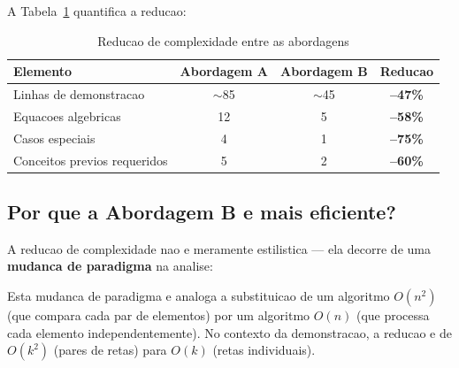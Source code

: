 \documentclass[5p]{elsarticle}
\theoremstyle{definition}
\begin{document}
A Tabela~\ref{tab:reduction} quantifica a reducao:

\begin{table}[H]
  \centering
  \caption{Reducao de complexidade entre as abordagens}
  \label{tab:reduction}
  \begin{tabular}{lccc}
    \toprule
    \textbf{Elemento} & \textbf{Abordagem A} & \textbf{Abordagem B} & \textbf{Reducao} \\
    \midrule
    Linhas de demonstracao & $\sim$85 & $\sim$45 & \textbf{--47\%} \\
    Equacoes algebricas & 12 & 5 & \textbf{--58\%} \\
    Casos especiais & 4 & 1 & \textbf{--75\%} \\
    Conceitos previos requeridos & 5 & 2 & \textbf{--60\%} \\
    \bottomrule
  \end{tabular}
\end{table}

\subsection{Por que a Abordagem B e mais eficiente?}

A reducao de complexidade nao e meramente estilistica — ela decorre de uma \textbf{mudanca
de paradigma} na analise:

\begin{center}
\end{center}

Esta mudanca de paradigma e analoga a substituicao de um algoritmo $O(n^2)$ (que compara
cada par de elementos) por um algoritmo $O(n)$ (que processa cada elemento independentemente).
No contexto da demonstracao, a reducao e de $O(k^2)$ (pares de retas) para $O(k)$
(retas individuais).
\end{document}
